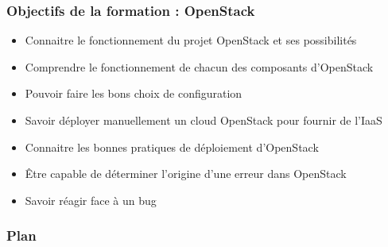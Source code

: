   \begin{frame}
    \frametitle{Objectifs de la formation : OpenStack}
    \begin{itemize}
      \item Connaitre le fonctionnement du projet OpenStack et ses possibilités
      \item Comprendre le fonctionnement de chacun des composants d'OpenStack
      \item Pouvoir faire les bons choix de configuration
      \item Savoir déployer manuellement un cloud OpenStack pour fournir de l'IaaS
      \item Connaitre les bonnes pratiques de déploiement d'OpenStack
      \item Être capable de déterminer l'origine d'une erreur dans OpenStack
      \item Savoir réagir face à un bug
    \end{itemize}
  \end{frame}

\begin{comment}
  \begin{frame}
    \frametitle{Pré-requis de la formation}
    \begin{itemize}
      \item Compétences d'administration système Linux tel qu'Ubuntu
      \begin{itemize}
        \item Gestion des paquets
        \item LVM et systèmes de fichiers
      \end{itemize}
      \item Notions de virtualisation, KVM et libvirt
      \item Réseau : iptables, namespaces
      \item Peut servir :
      \begin{itemize}
        \item À l'aise dans un environnement Python
      \end{itemize}
    \end{itemize}
  \end{frame}
\end{comment}

  \begin{frame}
    \frametitle{Plan}
    \tableofcontents[hideallsubsections]
  \end{frame}

